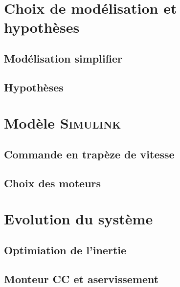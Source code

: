 \documentclass[12pt,a4paper]{article}
\begin{document}
\section{Choix de modélisation et hypothèses}
\subsection{Modélisation simplifier}
\subsection{Hypothèses}
\section{Modèle \textsc{Simulink}}
\subsection{Commande en trapèze de vitesse}
\subsection{Choix des moteurs}
\section{Evolution du système}
\subsection{Optimiation de l'inertie}
\subsection{Monteur CC et aservissement}




 
\end{document}
